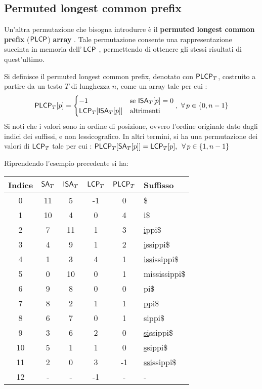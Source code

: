\subsection{Permuted longest common prefix}
Un'altra permutazione che bisogna introdurre è il \textbf{permuted
  longest common prefix} ($\mbox{\rm {\sf PLCP}}$) \textbf{array} \cite{plcp}.
Tale permutazione
consente una rappresentazione succinta in memoria dell'$\,\mbox{\rm {\sf LCP}}$ \cite{plcp2},
permettendo di ottenere gli stessi risultati di quest'ultimo.
\begin{definizione}
  Si definisce il permuted longest common prefix, denotato con
  $\mbox{\rm {\sf PLCP}}_T$, costruito a partire da un testo $T$ di lunghezza $n$, come un
  array tale per cui \cite{phoni}:
  \begin{equation}
    \label{eq:plcpdef1}
    \mbox{\rm {\sf PLCP}}_T[p]=
    \begin{cases}
      -1&\mbox{se }\mbox{\rm {\sf ISA}}_T[p]=0\\
     \mbox{\rm {\sf LCP}}_T[\mbox{\rm {\sf ISA}}_T[p]]&\mbox{altrimenti}
    \end{cases},\,\,\forall\, p\in\{0,n-1\}
  \end{equation}
  Si noti che i valori sono in ordine di posizione, ovvero l'ordine originale
  dato dagli indici dei suffissi, e non
  lessicografico. In altri termini, si ha una permutazione dei valori di $\mbox{\rm {\sf LCP}}_T$
  tale per cui \cite{plcp}: $\mbox{\rm {\sf PLCP}}_T[\mbox{\rm {\sf SA}}_T[p]] = \mbox{\rm {\sf LCP}}_T[p],\,\,\,\forall\,
  p\in\{1,n-1\}$ 
\end{definizione}
\begin{esempio}
  Riprendendo l'esempio precedente si ha:
  \begin{table}[H]
    \centering
    \footnotesize
    \begin{tabular}{c|c|c|c|c|l} 
      \textbf{Indice} & $\mbox{\rm {\sf SA}}_T$ & $\mbox{\rm {\sf ISA}}_T$ & $\mbox{\rm {\sf LCP}}_T$
      & $\mbox{\rm {\sf PLCP}}_T$ & \textbf{Suffisso}\\  
      \hline
      0 & 11 & 5 & -1 & 0 & \$\\
      1 & 10 & 4 & 0 & 4 & i\$\\
      2 & 7 & 11 & 1 & 3 & \underline{i}ppi\$\\
      3 & 4 & 9 & 1 & 2 & \underline{i}ssippi\$\\
      4 & 1 & 3 & 4 & 1 & \underline{issi}ssippi\$\\
      5 & 0 & 10 & 0 & 1 & mississippi\$\\
      6 & 9 & 8 & 0 & 0 & pi\$\\
      7 & 8 & 2 & 1 & 1 & \underline{p}pi\$\\
      8 & 6 & 7 & 0 & 1 & sippi\$\\
      9 & 3 & 6 & 2 & 0 & \underline{si}ssippi\$\\
      10 & 5 & 1 & 1 & 0 & \underline{s}sippi\$\\
      11 & 2 & 0 & 3 & -1 & \underline{ssi}ssippi\$\\
      12 & - & - & -1 & - & - 
    \end{tabular}
  \end{table}
\end{esempio}
